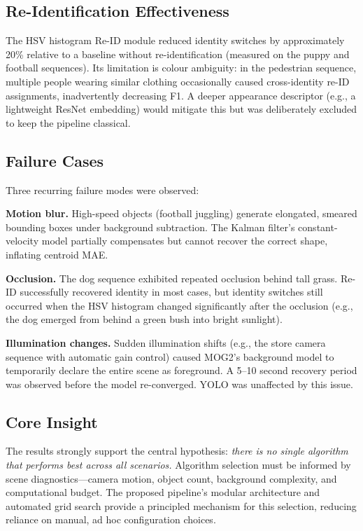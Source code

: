 \documentclass[10pt, conference, compsocconf]{IEEEtran}
\begin{document}
\subsection{Re-Identification Effectiveness}
The HSV histogram Re-ID module reduced identity switches by
approximately 20\% relative to a baseline without re-identification
(measured on the puppy and football sequences). Its limitation is
colour ambiguity: in the pedestrian sequence, multiple people wearing
similar clothing occasionally caused cross-identity re-ID assignments,
inadvertently decreasing F1. A deeper appearance descriptor
(e.g., a lightweight ResNet embedding) would mitigate this but
was deliberately excluded to keep the pipeline classical.

\subsection{Failure Cases}
Three recurring failure modes were observed:

\textbf{Motion blur.} High-speed objects (football juggling) generate
elongated, smeared bounding boxes under background subtraction. The
Kalman filter's constant-velocity model partially compensates but
cannot recover the correct shape, inflating centroid MAE.

\textbf{Occlusion.} The dog sequence exhibited repeated occlusion
behind tall grass. Re-ID successfully recovered identity in most
cases, but identity switches still occurred when the HSV histogram
changed significantly after the occlusion (e.g., the dog emerged
from behind a green bush into bright sunlight).

\textbf{Illumination changes.} Sudden illumination shifts (e.g., the
store camera sequence with automatic gain control) caused MOG2's
background model to temporarily declare the entire scene as foreground.
A 5--10 second recovery period was observed before the model
re-converged. YOLO was unaffected by this issue.

\subsection{Core Insight}
The results strongly support the central hypothesis:
\textit{there is no single algorithm that performs best across all
scenarios.} Algorithm selection must be informed by scene
diagnostics---camera motion, object count, background complexity,
and computational budget. The proposed pipeline's modular architecture
and automated grid search provide a principled mechanism for this
selection, reducing reliance on manual, ad hoc configuration choices.
\end{document}
